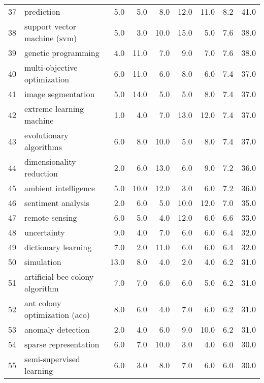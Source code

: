 \begin{tabular}{llrrrrrrr}
37 &                       prediction &   5.0 &   5.0 &    8.0 &   12.0 &   11.0 &    8.2 &   41.0 \\
38 &     support vector machine (svm) &   5.0 &   3.0 &   10.0 &   15.0 &    5.0 &    7.6 &   38.0 \\
39 &              genetic programming &   4.0 &  11.0 &    7.0 &    9.0 &    7.0 &    7.6 &   38.0 \\
40 &     multi-objective optimization &   6.0 &  11.0 &    6.0 &    8.0 &    6.0 &    7.4 &   37.0 \\
41 &               image segmentation &   5.0 &  14.0 &    5.0 &    5.0 &    8.0 &    7.4 &   37.0 \\
42 &         extreme learning machine &   1.0 &   4.0 &    7.0 &   13.0 &   12.0 &    7.4 &   37.0 \\
43 &          evolutionary algorithms &   6.0 &   8.0 &   10.0 &    5.0 &    8.0 &    7.4 &   37.0 \\
44 &         dimensionality reduction &   2.0 &   6.0 &   13.0 &    6.0 &    9.0 &    7.2 &   36.0 \\
45 &             ambient intelligence &   5.0 &  10.0 &   12.0 &    3.0 &    6.0 &    7.2 &   36.0 \\
46 &               sentiment analysis &   2.0 &   6.0 &    5.0 &   10.0 &   12.0 &    7.0 &   35.0 \\
47 &                   remote sensing &   6.0 &   5.0 &    4.0 &   12.0 &    6.0 &    6.6 &   33.0 \\
48 &                      uncertainty &   9.0 &   4.0 &    7.0 &    6.0 &    6.0 &    6.4 &   32.0 \\
49 &              dictionary learning &   7.0 &   2.0 &   11.0 &    6.0 &    6.0 &    6.4 &   32.0 \\
50 &                       simulation &  13.0 &   8.0 &    4.0 &    2.0 &    4.0 &    6.2 &   31.0 \\
51 &  artificial bee colony algorithm &   7.0 &   7.0 &    6.0 &    6.0 &    5.0 &    6.2 &   31.0 \\
52 &    ant colony optimization (aco) &   8.0 &   6.0 &    4.0 &    7.0 &    6.0 &    6.2 &   31.0 \\
53 &                anomaly detection &   2.0 &   4.0 &    6.0 &    9.0 &   10.0 &    6.2 &   31.0 \\
54 &            sparse representation &   6.0 &   7.0 &   10.0 &    3.0 &    4.0 &    6.0 &   30.0 \\
55 &         semi-supervised learning &   6.0 &   3.0 &    8.0 &    7.0 &    6.0 &    6.0 &   30.0 \\

\end{tabular}
